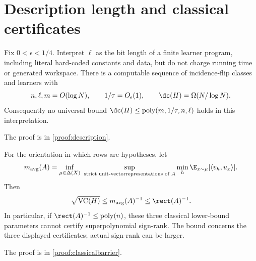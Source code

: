 \section{Description length and classical certificates}\label{app:resources}
\begin{theorem}\label{thm:description}
Fix $0<\epsilon<1/4$. Interpret $\ell$ as the bit length of a finite learner program, including literal hard-coded constants and data, but do not charge running time or generated workspace. There is a computable sequence of incidence-flip classes and learners with
\[
 n,\ell,m=O(\log N),\qquad 1/\tau=O_\epsilon(1),\qquad
 \dc(H)=\Omega(N/\log N).
\]
Consequently no universal bound $\dc(H)\le\operatorname{poly}(m,1/\tau,n,\ell)$ holds in this interpretation.
\end{theorem}
\noindent The proof is in \cref{proof:description}.

\begin{proposition}\label{thm:classicalbarrier}
For the orientation in which rows are hypotheses, let
\[
 m_{\rm avg}(A)=\inf_{\mu\in\Delta(X)}\ 
 \sup_{\substack{\text{strict unit-vector}\text{representations of }A}}
 \min_h\E_{x\sim\mu}|\langle v_h,u_x\rangle|.
\]
Then
\[
 \sqrt{\operatorname{VC}(H)}\le m_{\rm avg}(A)^{-1}\le\rect(A)^{-1}.
\]
In particular, if $\rect(A)^{-1}\le\operatorname{poly}(n)$, these three classical lower-bound parameters cannot certify superpolynomial sign-rank. The bound concerns the three displayed certificates; actual sign-rank can be larger.
\end{proposition}
\noindent The proof is in \cref{proof:classicalbarrier}.
